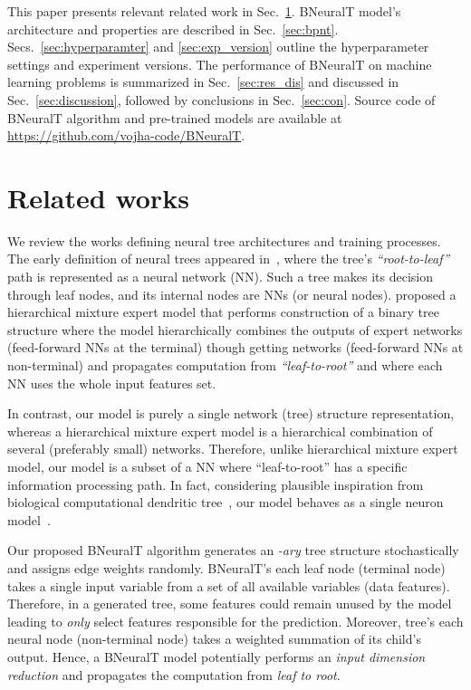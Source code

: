 \documentclass[11pt,a4paper]{article}
\begin{document}
    
    This paper presents relevant related work in Sec.~\ref{sec:related_work}. BNeuralT model's architecture and properties are described in Sec.~\ref{sec:bpnt}. Secs.~\ref{sec:hyperparamter} and \ref{sec:exp_version} outline the hyperparameter settings and experiment versions. The performance of BNeuralT on machine learning problems is summarized in Sec.~\ref{sec:res_dis} and discussed in Sec.~\ref{sec:discussion}, followed by conclusions in Sec.~\ref{sec:con}. Source code of BNeuralT algorithm and pre-trained models are available at \url{https://github.com/vojha-code/BNeuralT}.
    
    
    
    \section{Related works}
    \label{sec:related_work}
We review the works defining neural tree architectures and training processes. The early definition of neural trees appeared in~\citep{sakar1993growing,sirat1990neural}, where the tree's \textit{``root-to-leaf''} path is represented as a neural network (NN). Such a tree makes its decision through leaf nodes, and its internal nodes are NNs (or neural nodes). \cite{jordan1994hierarchical} proposed a hierarchical mixture expert model that performs construction of a binary tree structure where the model hierarchically combines the outputs of expert networks (feed-forward NNs at the terminal) though getting networks (feed-forward NNs at non-terminal) and propagates computation from \textit{``leaf-to-root''} and where each NN uses the whole input features set. 
    
    In contrast, our model is purely a single network (tree) structure representation, whereas a hierarchical mixture expert model is a hierarchical combination of several (preferably small) networks. Therefore, unlike hierarchical mixture expert model, our model is a subset of a NN where ``leaf-to-root'' has a specific information processing path. 
    In fact, considering plausible inspiration from biological computational dendritic tree~\citep{travis2005regional,mel2016toward,poirazi2003pyramidal}, our model behaves as a single neuron model~\citep{jones2021might}.
    
    Our proposed BNeuralT algorithm generates an \textit{-ary} tree structure stochastically and assigns edge weights randomly. BNeuralT's each leaf node (terminal node) takes a single input variable from a set of all available variables (data features). Therefore, in a generated tree, some features could remain unused by the model leading to \textit{only} select features responsible for the prediction. Moreover, tree's each neural node (non-terminal node) takes a weighted summation of its child's output. Hence, a BNeuralT model potentially performs an \textit{input dimension reduction} and propagates the computation from \textit{leaf to root}. 
\end{document}
